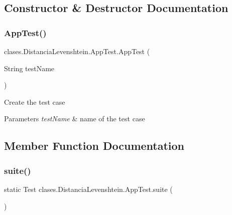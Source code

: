 \subsection{Constructor \& Destructor Documentation}
\hypertarget{classclases_1_1_distancia_levenshtein_1_1_app_test_a811706b4c4e90cf825130e5603ec8484}{}\label{classclases_1_1_distancia_levenshtein_1_1_app_test_a811706b4c4e90cf825130e5603ec8484} 
\subsubsection{\texorpdfstring{App\+Test()}{AppTest()}}
{\footnotesize\ttfamily clases.\+Distancia\+Levenshtein.\+App\+Test.\+App\+Test (\begin{DoxyParamCaption}\item[{String}]{test\+Name }\end{DoxyParamCaption})}

Create the test case


\begin{DoxyParams}{Parameters}
{\em test\+Name} & name of the test case \\
\hline
\end{DoxyParams}


\subsection{Member Function Documentation}
\hypertarget{classclases_1_1_distancia_levenshtein_1_1_app_test_a2f8dab2e95f46b42a3b0b1836b283f53}{}\label{classclases_1_1_distancia_levenshtein_1_1_app_test_a2f8dab2e95f46b42a3b0b1836b283f53} 
\subsubsection{\texorpdfstring{suite()}{suite()}}
{\footnotesize\ttfamily static Test clases.\+Distancia\+Levenshtein.\+App\+Test.\+suite (\begin{DoxyParamCaption}{ }\end{DoxyParamCaption})\hspace{0.3cm}{\ttfamily [static]}}

